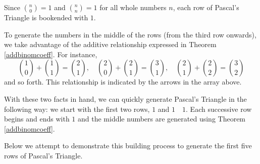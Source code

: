 \documentclass{ximera}
\begin{document}
Since $\displaystyle{\binom{n}{0} = 1}$ and $\displaystyle{\binom{n}{n} = 1}$ for all whole numbers $n$, each row of Pascal's Triangle is bookended with $1$.

 

 To generate the numbers in the middle of the rows (from the third row onwards), we take advantage of the additive relationship expressed in  Theorem \ref{addbinomcoeff}.  For instance, \[ \binom{1}{0} + \binom{1}{1} = \binom{2}{1}, \quad  \binom{2}{0} + \binom{2}{1} = \binom{3}{1}, \quad \binom{2}{1} + \binom{2}{2} = \binom{3}{2} \] and so forth.  This relationship is indicated by the arrows in the array above. 
 
  
 
 With these two facts in hand, we can quickly generate Pascal's Triangle in the following way:  we start with the first two rows, $1$ and $1 \quad 1$.   Each successive row begins and ends with $1$ and the middle numbers are generated using Theorem \ref{addbinomcoeff}.  
 
  
 
 Below we attempt to demonstrate this building process to generate the first five rows of Pascal's Triangle.
\end{document}
